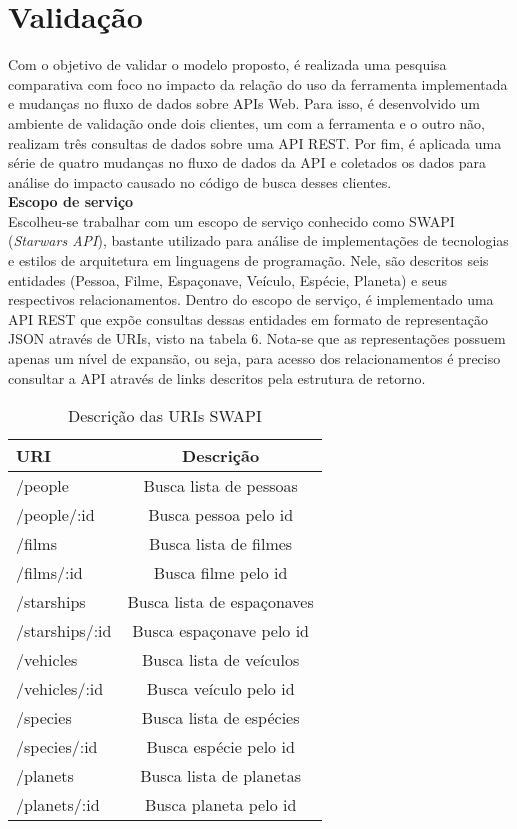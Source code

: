 \chapter{Validação}

Com o objetivo de validar o modelo proposto, é realizada uma pesquisa comparativa com foco no impacto da relação do uso da ferramenta implementada e mudanças no fluxo de dados sobre APIs Web. Para isso, é desenvolvido um ambiente de validação onde dois clientes, um com a ferramenta e o outro não, realizam três consultas de dados sobre uma API REST. Por fim, é aplicada uma série de quatro mudanças no fluxo de dados da API e coletados os dados para análise do impacto causado no código de busca desses clientes. \\

\textbf{Escopo de serviço} \\

Escolheu-se trabalhar com um escopo de serviço conhecido como SWAPI (\textit{Starwars API}), bastante utilizado para análise de implementações de tecnologias e estilos de arquitetura em linguagens de programação. Nele, são descritos seis entidades (Pessoa, Filme, Espaçonave, Veículo, Espécie, Planeta) e seus respectivos relacionamentos. Dentro do escopo de serviço, é implementado uma API REST que expõe consultas dessas entidades em formato de representação JSON através de URIs, visto na tabela 6. Nota-se que as representações possuem apenas um nível de expansão, ou seja, para acesso dos relacionamentos é preciso consultar a API através de links descritos pela estrutura de retorno.

\begin{table}[H]
  \centering
  \begin{tabular}{|l|c|}
    \hline
    URI & Descrição \\
    \hline
    /people & Busca lista de pessoas \\
    \hline
    /people/:id & Busca pessoa pelo id \\
    \hline
    /films & Busca lista de filmes \\
    \hline
    /films/:id & Busca filme pelo id \\
    \hline
    /starships & Busca lista de espaçonaves \\
    \hline
    /starships/:id & Busca espaçonave pelo id \\
    \hline
    /vehicles & Busca lista de veículos \\
    \hline
    /vehicles/:id & Busca veículo pelo id \\
    \hline
    /species & Busca lista de espécies \\
    \hline
    /species/:id & Busca espécie pelo id \\
    \hline
    /planets & Busca lista de planetas \\
    \hline
    /planets/:id & Busca planeta pelo id \\
    \hline
  \end{tabular}
  \caption{Descrição das URIs SWAPI}
\end{table}

